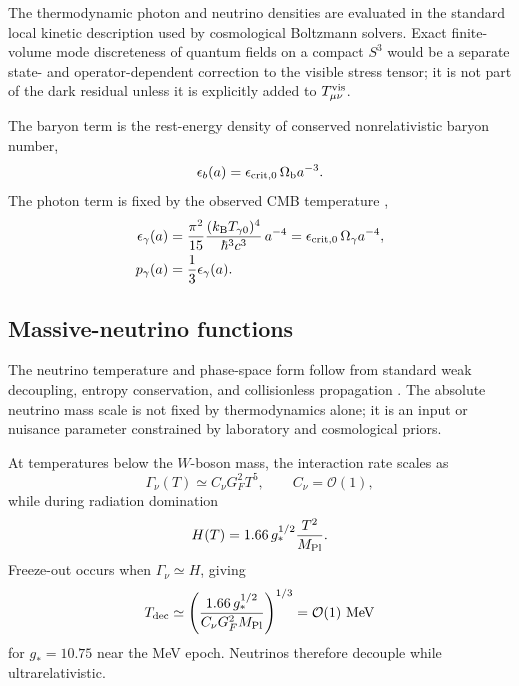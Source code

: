 \documentclass[
  aps,
  prd,
  reprint,
  superscriptaddress,
  nofootinbib,
  floatfix,
  longbibliography
]{revtex4-2}
\theoremstyle{plain}
\theoremstyle{definition}
\theoremstyle{remark}
\newcommand{\crit}{\epsilon_{\mathrm{crit},0}}
\newcommand{\Ob}{\Omega_{\rm b}}
\newcommand{\Og}{\Omega_\gamma}
\begin{document}
The thermodynamic photon and neutrino densities are evaluated in the standard
local kinetic description used by cosmological Boltzmann solvers.  Exact
finite-volume mode discreteness of quantum fields on a compact $S^3$ would be a
separate state- and operator-dependent correction to the visible stress tensor;
it is not part of the dark residual unless it is explicitly added to
$T^{\rm vis}_{\mu\nu}$.

The baryon term is the rest-energy density of conserved nonrelativistic baryon
number,
\begin{equation}
\epsilon_b(a)=\crit\,\Ob a^{-3}.
\label{eq:baryon_closure}
\end{equation}
The photon term is fixed by the observed CMB temperature \cite{Fixsen2009},
\begin{align}
\epsilon_\gamma(a)
&=\frac{\pi^2}{15}
\frac{(k_{\rm B}T_{\gamma0})^4}{\hbar^3c^3}\,a^{-4}
=\crit\,\Og a^{-4},
\nonumber\\
p_\gamma(a)&=\frac13\epsilon_\gamma(a).
\label{eq:photon_closure}
\end{align}

\subsection{Massive-neutrino functions}

The neutrino temperature and phase-space form follow from standard weak
decoupling, entropy conservation, and collisionless propagation
\cite{DodelsonSchmidt2020,Mukhanov2005,LesgourguesPastor2006,LesgourguesPastor2012}.
The absolute neutrino mass scale is not fixed by thermodynamics alone; it is an
input or nuisance parameter constrained by laboratory and cosmological priors.

At temperatures below the $W$-boson mass, the interaction rate scales as
\begin{equation}
\Gamma_\nu(T)\simeq C_\nu G_F^2T^5,\qquad C_\nu=\mathcal O(1),
\label{eq:nu_rate}
\end{equation}
while during radiation domination
\begin{equation}
H(T)=1.66\,g_*^{1/2}\frac{T^2}{M_{\rm Pl}}.
\label{eq:radiation_H}
\end{equation}
Freeze-out occurs when $\Gamma_\nu\simeq H$, giving
\begin{equation}
T_{\rm dec}\simeq
\left(\frac{1.66\,g_*^{1/2}}{C_\nu G_F^2M_{\rm Pl}}\right)^{1/3}
=\mathcal O(1)\ {\rm MeV}
\label{eq:Tdec}
\end{equation}
for $g_*=10.75$ near the MeV epoch.  Neutrinos therefore decouple while
ultrarelativistic.
\end{document}
